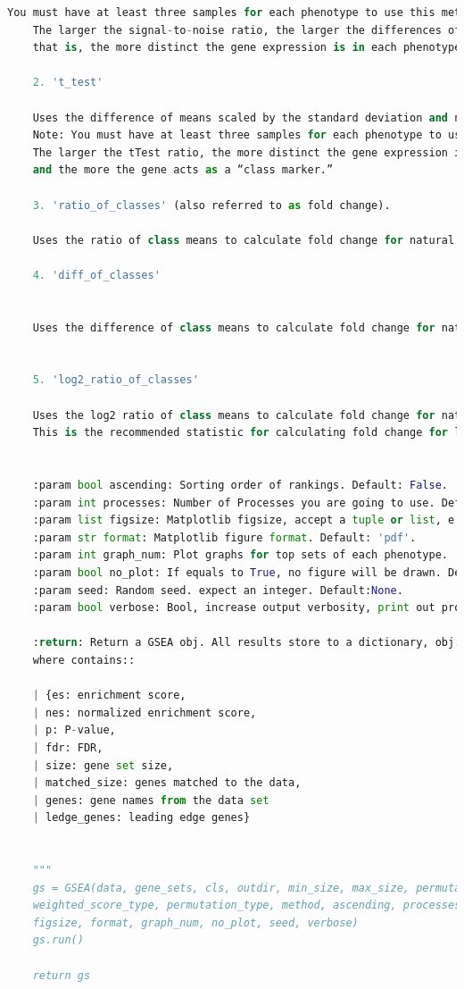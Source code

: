 \documentclass{article}
\begin{document}
\begin{appendices}
\begin{lstlisting}[language=Python, caption={Sample that ranked last},captionpos=b]
    You must have at least three samples for each phenotype to use this metric.
    The larger the signal-to-noise ratio, the larger the differences of the means (scaled by the standard deviations);
    that is, the more distinct the gene expression is in each phenotype and the more the gene acts as a “class marker.”
    
    2. 't_test'
    
    Uses the difference of means scaled by the standard deviation and number of samples.
    Note: You must have at least three samples for each phenotype to use this metric.
    The larger the tTest ratio, the more distinct the gene expression is in each phenotype
    and the more the gene acts as a “class marker.”
    
    3. 'ratio_of_classes' (also referred to as fold change).
    
    Uses the ratio of class means to calculate fold change for natural scale data.
    
    4. 'diff_of_classes'
    
    
    Uses the difference of class means to calculate fold change for nature scale data
    
    
    5. 'log2_ratio_of_classes'
    
    Uses the log2 ratio of class means to calculate fold change for natural scale data.
    This is the recommended statistic for calculating fold change for log scale data.
    
    
    :param bool ascending: Sorting order of rankings. Default: False.
    :param int processes: Number of Processes you are going to use. Default: 1.
    :param list figsize: Matplotlib figsize, accept a tuple or list, e.g. [width,height]. Default: [6.5,6].
    :param str format: Matplotlib figure format. Default: 'pdf'.
    :param int graph_num: Plot graphs for top sets of each phenotype.
    :param bool no_plot: If equals to True, no figure will be drawn. Default: False.
    :param seed: Random seed. expect an integer. Default:None.
    :param bool verbose: Bool, increase output verbosity, print out progress of your job, Default: False.
    
    :return: Return a GSEA obj. All results store to a dictionary, obj.results,
    where contains::
    
    | {es: enrichment score,
    | nes: normalized enrichment score,
    | p: P-value,
    | fdr: FDR,
    | size: gene set size,
    | matched_size: genes matched to the data,
    | genes: gene names from the data set
    | ledge_genes: leading edge genes}
    
    
    """
    gs = GSEA(data, gene_sets, cls, outdir, min_size, max_size, permutation_num,
    weighted_score_type, permutation_type, method, ascending, processes,
    figsize, format, graph_num, no_plot, seed, verbose)
    gs.run()
    
    return gs

\end{lstlisting}

\end{appendices}
\end{document}
